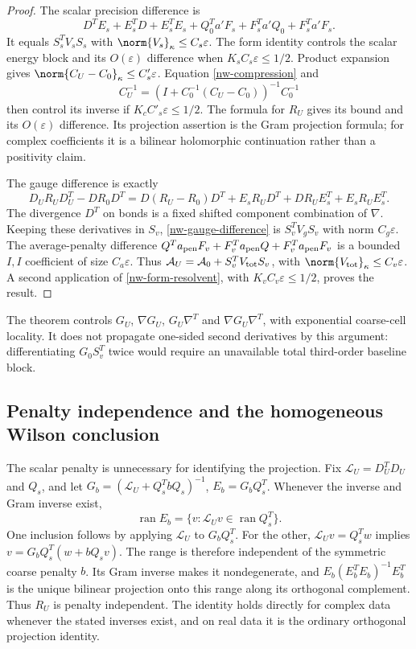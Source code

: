 \begin{proof}
The scalar precision difference is
\[
 D^TE_s+E_s^TD+E_s^TE_s+
 Q_0^Ta'F_s+F_s^Ta'Q_0+F_s^Ta'F_s.
\]
It equals $S_s^TV_sS_s$ with $\norm{V_s}_\kappa\le C_s\varepsilon$.
The form identity controls the scalar energy block and its
$O(\varepsilon)$ difference when $K_sC_s\varepsilon\le1/2$.
Product expansion gives $\norm{C_U-C_0}_\kappa\le C'_s\varepsilon$.
Equation \eqref{nw-compression} and
\[
 C_U^{-1}=(I+C_0^{-1}(C_U-C_0))^{-1}C_0^{-1}
\]
then control its inverse if $K_cC'_s\varepsilon\le1/2$.
The formula for $R_U$ gives its bound and its
$O(\varepsilon)$ difference. Its projection assertion is the Gram
projection formula; for complex coefficients it is a bilinear
holomorphic continuation rather than a positivity claim.

The gauge difference is exactly
\begin{equation}\label{nw-gauge-difference}
 D_UR_UD_U^T-DR_0D^T
 =D(R_U-R_0)D^T+E_sR_UD^T+DR_UE_s^T+E_sR_UE_s^T.
\end{equation}
The divergence $D^T$ on bonds is a fixed shifted component
combination of $\nabla$. Keeping these derivatives in $S_v$,
\eqref{nw-gauge-difference} is $S_v^TV_gS_v$ with norm
$C_g\varepsilon$. The average-penalty difference
$Q^Ta_{\rm pen}F_v+F_v^Ta_{\rm pen}Q+F_v^Ta_{\rm pen}F_v$
is a bounded $I,I$ coefficient of size $C_a\varepsilon$.
Thus $\mathcal A_U=\mathcal A_0+S_v^TV_{\rm tot}S_v$,
with $\norm{V_{\rm tot}}_\kappa\le C_v\varepsilon$.
A second application of \eqref{nw-form-resolvent}, with
$K_vC_v\varepsilon\le1/2$, proves the result.
\end{proof}

The theorem controls $G_U$, $\nabla G_U$, $G_U\nabla^T$ and
$\nabla G_U\nabla^T$, with exponential coarse-cell locality.
It does not propagate one-sided second derivatives by this
argument: differentiating $G_0S_v^T$ twice would require an
unavailable total third-order baseline block.

\subsection{Penalty independence and the homogeneous Wilson conclusion}
\label{nw-conclusion}

The scalar penalty is unnecessary for identifying the projection.
Fix $\mathcal L_U=D_U^TD_U$ and $Q_s$, and let
$G_b=(\mathcal L_U+Q_s^TbQ_s)^{-1}$,
$E_b=G_bQ_s^T$. Whenever the inverse and Gram inverse exist,
\begin{equation}\label{nw-range}
 \operatorname{ran}E_b
   =\{v:\mathcal L_Uv\in\operatorname{ran}Q_s^T\}.
\end{equation}
One inclusion follows by applying $\mathcal L_U$ to $G_bQ_s^T$.
For the other, $\mathcal L_Uv=Q_s^Tw$ implies
$v=G_bQ_s^T(w+bQ_sv)$.
The range is therefore independent of the symmetric coarse penalty
$b$. Its Gram inverse makes it nondegenerate, and
$E_b(E_b^TE_b)^{-1}E_b^T$ is the unique bilinear projection
onto this range along its orthogonal complement. Thus $R_U$ is
penalty independent. The identity holds directly for complex data
whenever the stated inverses exist, and on real data it is the
ordinary orthogonal projection identity.


